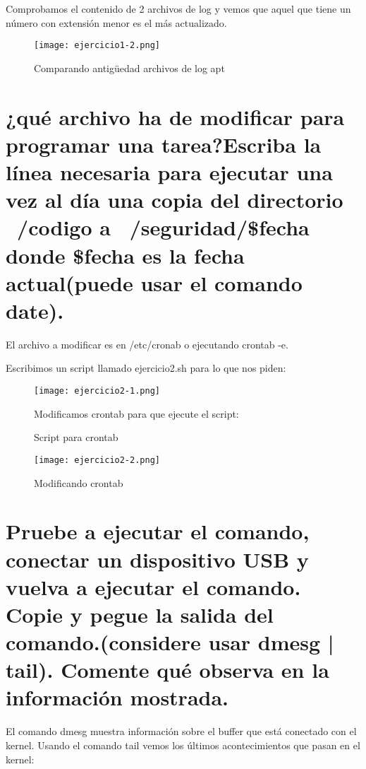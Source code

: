 	Comprobamos el contenido de 2 archivos de log y vemos que aquel que tiene un número con extensión menor es el más actualizado.
	
	\begin{figure}[H] 
		\centering
		\texttt{[image: ejercicio1-2.png]} 
		\label{figura2} 
		\caption{Comparando antigüedad archivos de log apt}
	\end{figure} 
	
	
	\section{¿qué archivo ha de modificar para programar una tarea?Escriba la línea necesaria para ejecutar una vez al día una copia del directorio ~/codigo a ~/seguridad/\$fecha donde \$fecha es la fecha actual(puede usar el comando date).}
	
	
	El archivo a modificar es en /etc/cronab o ejecutando crontab -e\cite{ejercicio2-1}.
	
	Escribimos un script llamado ejercicio2.sh para lo que nos piden:
	\begin{figure}[H] 
		\centering
		\texttt{[image: ejercicio2-1.png]} 
		\label{figura2} 
		\caption{Script para crontab}
		
	Modificamos crontab para que ejecute el script:
	\end{figure}
	
		\begin{figure}[H] 
			\centering
			\texttt{[image: ejercicio2-2.png]} 
			\label{figura2} 
			\caption{Modificando crontab}
		\end{figure}
	
	\section{Pruebe a ejecutar el comando, conectar un dispositivo USB y vuelva a ejecutar el comando. Copie y pegue la salida del comando.(considere usar dmesg | tail). Comente qué observa en la información mostrada.}
	
	El comando dmesg\cite{ejercicio3-1} muestra información sobre el buffer que está conectado con el kernel. Usando el comando tail vemos los últimos acontecimientos que pasan en el kernel:
	
